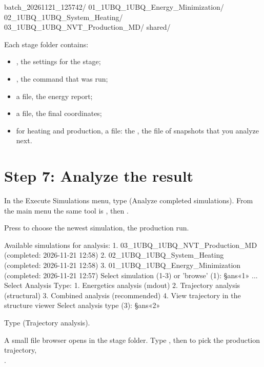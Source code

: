 \begin{screen}
batch_20261121_125742/
  01_1UBQ_1UBQ_Energy_Minimization/
  02_1UBQ_1UBQ_System_Heating/
  03_1UBQ_1UBQ_NVT_Production_MD/
  shared/
\end{screen}

Each stage folder contains:
\begin{itemize}
  \item {}, the settings for the stage;
  \item {}, the command that was run;
  \item a  file, the energy report;
  \item a  file, the final coordinates;
  \item for heating and production, a  file: the
        , the file of snapshots that you analyze next.
\end{itemize}

\section{Step 7: Analyze the result}\label{sec:tutorial-analysis}

\begin{steps}
  \item In the Execute Simulations menu, type  (Analyze completed
        simulations). From the main menu the same tool is , then
        .
  \item Press  to choose the newest simulation, the production run.
\end{steps}

\begin{screen}
Available simulations for analysis:
  1. 03_1UBQ_1UBQ_NVT_Production_MD (completed: 2026-11-21 12:58)
  2. 02_1UBQ_1UBQ_System_Heating (completed: 2026-11-21 12:58)
  3. 01_1UBQ_1UBQ_Energy_Minimization (completed: 2026-11-21 12:57)
Select simulation (1-3) or 'browse' (1): §ans«1»
...
Select Analysis Type:
  1. Energetics analysis (mdout)
  2. Trajectory analysis (structural)
  3. Combined analysis (recommended)
  4. View trajectory in the structure viewer
Select analysis type (3): §ans«2»
\end{screen}

\begin{steps}[resume]
  \item Type  (Trajectory analysis).
  \item A small file browser opens in the stage folder. Type ,
        then  to pick the production trajectory,\\
        .
\end{steps}

